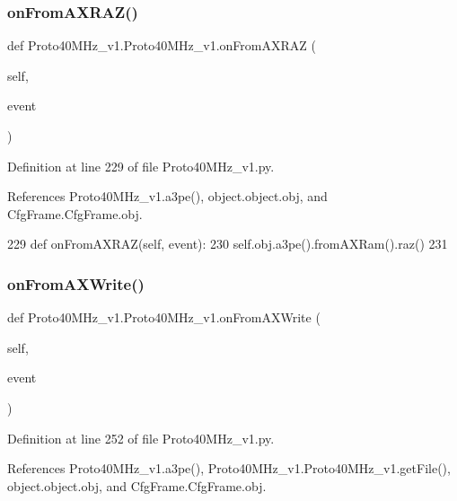 \subsubsection{\texorpdfstring{on\+From\+A\+X\+R\+A\+Z()}{onFromAXRAZ()}}
{\footnotesize\ttfamily def Proto40\+M\+Hz\+\_\+v1.\+Proto40\+M\+Hz\+\_\+v1.\+on\+From\+A\+X\+R\+AZ (\begin{DoxyParamCaption}\item[{}]{self,  }\item[{}]{event }\end{DoxyParamCaption})}



Definition at line 229 of file Proto40\+M\+Hz\+\_\+v1.\+py.



References Proto40\+M\+Hz\+\_\+v1.\+a3pe(), object.\+object.\+obj, and Cfg\+Frame.\+Cfg\+Frame.\+obj.


\begin{DoxyCode}
229     \textcolor{keyword}{def }onFromAXRAZ(self, event):
230         self.obj.a3pe().fromAXRam().raz()
231 
\end{DoxyCode}
\mbox{\label{classProto40MHz__v1_1_1Proto40MHz__v1_ac8f631c7bc3944eadb1c8fce58f21a6d}} 
\subsubsection{\texorpdfstring{on\+From\+A\+X\+Write()}{onFromAXWrite()}}
{\footnotesize\ttfamily def Proto40\+M\+Hz\+\_\+v1.\+Proto40\+M\+Hz\+\_\+v1.\+on\+From\+A\+X\+Write (\begin{DoxyParamCaption}\item[{}]{self,  }\item[{}]{event }\end{DoxyParamCaption})}



Definition at line 252 of file Proto40\+M\+Hz\+\_\+v1.\+py.



References Proto40\+M\+Hz\+\_\+v1.\+a3pe(), Proto40\+M\+Hz\+\_\+v1.\+Proto40\+M\+Hz\+\_\+v1.\+get\+File(), object.\+object.\+obj, and Cfg\+Frame.\+Cfg\+Frame.\+obj.


